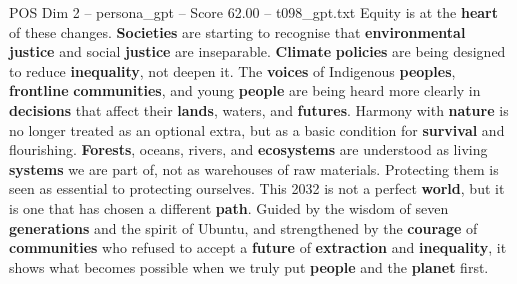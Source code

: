 \begin{textsample}{POS Dim 2 – persona\_gpt – Score 62.00 – t098\_gpt.txt}
Equity is at the \textbf{heart} of these changes. \textbf{Societies} are starting to recognise that \textbf{environmental} \textbf{justice} and social \textbf{justice} are inseparable. \textbf{Climate} \textbf{policies} are being designed to reduce \textbf{inequality}, not deepen it.
The \textbf{voices} of Indigenous \textbf{peoples}, \textbf{frontline} \textbf{communities}, and young \textbf{people} are being heard more clearly in \textbf{decisions} that affect their \textbf{lands}, waters, and \textbf{futures}.
Harmony with \textbf{nature} is no longer treated as an optional extra, but as a basic condition for \textbf{survival} and flourishing. \textbf{Forests}, oceans, rivers, and \textbf{ecosystems} are understood as living \textbf{systems} we are part of, not as warehouses of raw materials.
Protecting them is seen as essential to protecting ourselves.
This 2032 is not a perfect \textbf{world}, but it is one that has chosen a different \textbf{path}.
Guided by the wisdom of seven \textbf{generations} and the spirit of Ubuntu, and strengthened by the \textbf{courage} of \textbf{communities} who refused to accept a \textbf{future} of \textbf{extraction} and \textbf{inequality}, it shows what becomes possible when we truly put \textbf{people} and the \textbf{planet} first.

\end{textsample}
